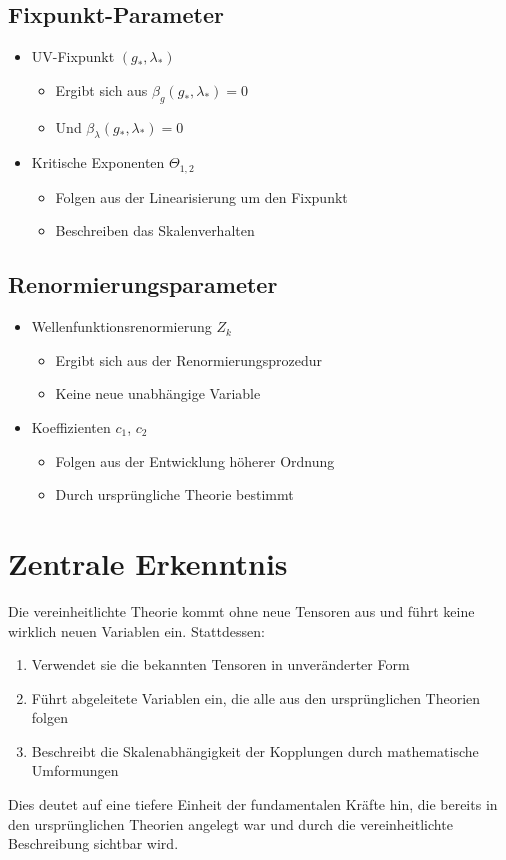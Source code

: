 \documentclass{article}
\begin{document}
	\subsection{Fixpunkt-Parameter}
	\begin{itemize}
		\item UV-Fixpunkt $(g_*,\lambda_*)$
		\begin{itemize}
			\item Ergibt sich aus $\beta_g(g_*,\lambda_*) = 0$
			\item Und $\beta_\lambda(g_*,\lambda_*) = 0$
		\end{itemize}
		
		\item Kritische Exponenten $\Theta_{1,2}$
		\begin{itemize}
			\item Folgen aus der Linearisierung um den Fixpunkt
			\item Beschreiben das Skalenverhalten
		\end{itemize}
	\end{itemize}
	
	\subsection{Renormierungsparameter}
	\begin{itemize}
		\item Wellenfunktionsrenormierung $Z_k$
		\begin{itemize}
			\item Ergibt sich aus der Renormierungsprozedur
			\item Keine neue unabhängige Variable
		\end{itemize}
		
		\item Koeffizienten $c_1$, $c_2$
		\begin{itemize}
			\item Folgen aus der Entwicklung höherer Ordnung
			\item Durch ursprüngliche Theorie bestimmt
		\end{itemize}
	\end{itemize}
	
	\section{Zentrale Erkenntnis}
	
	Die vereinheitlichte Theorie kommt ohne neue Tensoren aus und führt keine wirklich neuen Variablen ein. Stattdessen:
	\begin{enumerate}
		\item Verwendet sie die bekannten Tensoren in unveränderter Form
		\item Führt abgeleitete Variablen ein, die alle aus den ursprünglichen Theorien folgen
		\item Beschreibt die Skalenabhängigkeit der Kopplungen durch mathematische Umformungen
	\end{enumerate}
	
	Dies deutet auf eine tiefere Einheit der fundamentalen Kräfte hin, die bereits in den ursprünglichen Theorien angelegt war und durch die vereinheitlichte Beschreibung sichtbar wird.
	
\end{document}
